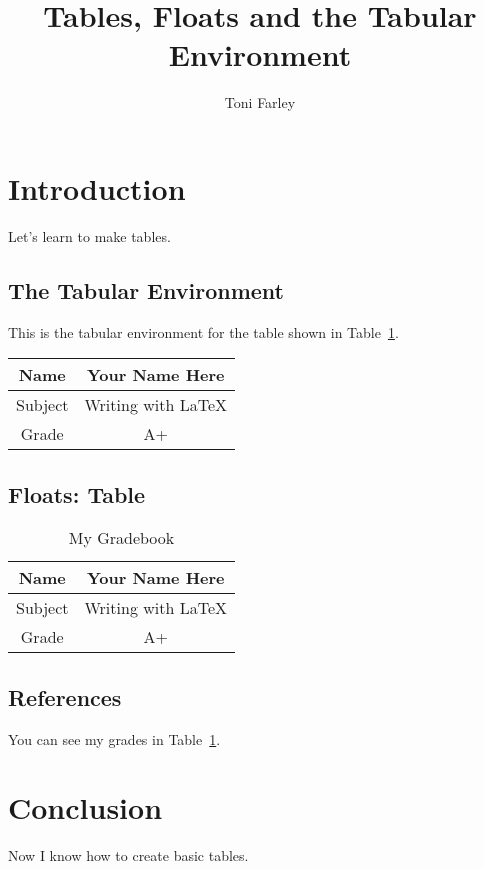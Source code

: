 \documentclass{article}
\title{Tables, Floats and the Tabular Environment}
\author{Toni Farley}
\date{}
\begin{document}
\maketitle

\section{Introduction}

Let's learn to make tables.

\subsection{The Tabular Environment}

This is the tabular environment for the table shown in Table~\ref{tab:grades}.

\bigskip

\begin{tabular}{|c||c|}
\hline 
Name & Your Name Here \\
\hline 
Subject & Writing with \LaTeX \\
\hline 
Grade & A+ \\
\hline 
\end{tabular}

\subsection{Floats: Table}

\begin{table}[htbp]
\caption{My Gradebook}
\begin{center}
\begin{tabular}{|c||c|}
\hline 
Name & Your Name Here \\
\hline 
Subject & Writing with \LaTeX \\
\hline 
Grade & A+ \\
\hline 
\end{tabular}
\end{center}
\label{tab:grades}
\end{table}

\subsection{References}

You can see my grades in Table~\ref{tab:grades}.

\section{Conclusion}

Now I know how to create basic tables.
\end{document}
